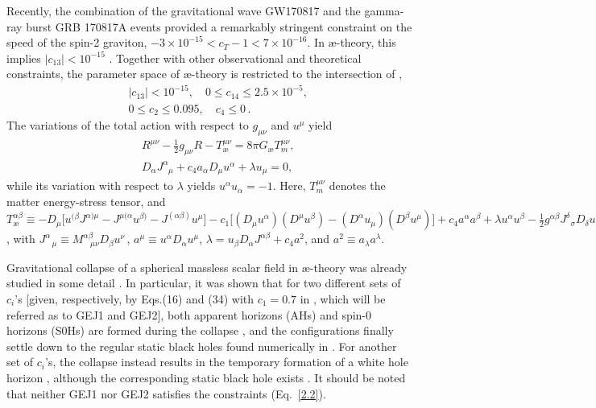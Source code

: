 \documentclass[aps,preprintnumbers,twocolumn,showpacs]{revtex4-1}
\begin{document}
Recently,  the combination of the gravitational wave GW170817 \cite{GW170817}
and the  gamma-ray burst  GRB 170817A \cite{GRB170817} events provided  a remarkably stringent constraint on the speed of the spin-2 graviton, $- 3\times 10^{-15} < c_T -1 < 7\times 10^{-16}$. In  $\mbox{\ae}$-theory,  this implies $\left |c_{13}\right| < 10^{-15}$ \cite{JM04}. Together with other observational and theoretical constraints,  the parameter space of $\mbox{\ae}$-theory is restricted to the intersection of \cite{OMW18},
 \begin{eqnarray}
\label{2.2}
&&  \left|c_{13}\right| < 10^{-15}, \quad 0 \leq c_{14} \leq 2.5\times 10^{-5}, \nonumber\\
&&  0 \leq c_2 \leq 0.095,\quad c_{4} \leq 0\,.
 \end{eqnarray}
The variations of the total action with respect to $g_{\mu\nu}$ and  $u^{\mu}$ yield
 \begin{eqnarray}
 \label{2.3a}
&&  R^{\mu\nu} - \frac{1}{2}g_{\mu\nu}R - T^{\mu\nu}_{\mbox{\ae}} = 8\pi G_{\mbox{\ae}} T_{m}^{\mu\nu},\\
 \label{2.3b}
&&   D_{\alpha} J^{\alpha}_{~~~\mu} + c_4 a_{\alpha} D_{\mu}u^{\alpha} + \lambda u_{\mu} = 0,
 \end{eqnarray}
while its variation with respect to $\lambda$ yields $u^{\alpha}u_{\alpha} = -1$. Here, $T_{m}^{\mu\nu}$ denotes the matter energy-stress tensor,  and 
  $T_{\mbox{\ae}}^{\alpha\beta} \equiv
  -D_{\mu}\big[u^{(\beta}J^{\alpha) \mu} - J^{\mu(\alpha}u^{\beta)} - J^{(\alpha\beta)}u^{\mu}\big]
 - c_1\big[\left(D_{\mu}u^{\alpha}\right)\left(D^{\mu}u^{\beta}\right) - \left(D^{\alpha}u_{\mu}\right)\left(D^{\beta}u^{\mu}\right)\big]
 + c_4 a^{\alpha}a^{\beta}    + \lambda  u^{\alpha}u^{\beta} - \frac{1}{2}  g^{\alpha\beta} J^{\delta}_{\;\;\sigma} D_{\delta}u^{\sigma}$,
 with
$ J^{\alpha}_{\;\;\;\mu} \equiv M^{\alpha\beta}_{~~~~\mu\nu}D_{\beta}u^{\nu}\,$,
$a^{\mu} \equiv u^{\alpha}D_{\alpha}u^{\mu}$,
$\lambda = u_{\beta}D_{\alpha}J^{\alpha\beta} + c_4 a^2$, and $a^{2}\equiv a_{\lambda}a^{\lambda}$.

Gravitational collapse of a spherical massless scalar field in $\mbox{\ae}$-theory was already studied in some detail \cite{GEJ07,AGG18}. In particular, it was shown that  for two different sets of $c_i$'s [given, respectively, by Eqs.(16) and (34) with $c_1 = 0.7$ in  \cite{GEJ07}, which will be referred as to GEJ1 and GEJ2],   both  apparent horizons  (AHs) and spin-0 horizons (S0Hs) are formed during the collapse \cite{GEJ07}, and  the configurations finally settle down to  the regular static black holes found numerically  in  \cite{EJ06}. For another set of $c_i$'s, the collapse  instead  results in the temporary formation of a white hole horizon \cite{AGG18}, although the corresponding  static black hole exists   \cite{BJS11}. It should be noted that neither GEJ1 nor GEJ2 satisfies  the constraints (Eq.~\ref{2.2}). 
\end{document}
